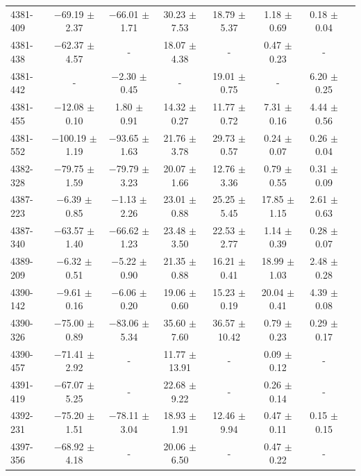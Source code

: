 \documentclass[a4paper,fleqn,usenatbib]{mnras}     %
\begin{document}
\begin{longtable}{l c c c c c c c }
4381-409   &   $-$69.19 $\pm$ 2.37   &   $-$66.01 $\pm$ 1.71   &    30.23 $\pm$ 7.53   &  18.79 $\pm$ 5.37   &   1.18 $\pm$ 0.69   &   0.18 $\pm$ 0.04  \\
4381-438   &   $-$62.37 $\pm$ 4.57   &     -   &    18.07 $\pm$ 4.38   &   -   &   0.47 $\pm$ 0.23   &   -  \\
4381-442   &     -   &    $-$2.30 $\pm$ 0.45   &     -   &  19.01 $\pm$ 0.75   &   -   &   6.20 $\pm$ 0.25  \\
4381-455   &   $-$12.08 $\pm$ 0.10   &     1.80 $\pm$ 0.91   &    14.32 $\pm$ 0.27   &  11.77 $\pm$ 0.72   &   7.31 $\pm$ 0.16   &   4.44 $\pm$ 0.56  \\
4381-552   &  $-$100.19 $\pm$ 1.19   &   $-$93.65 $\pm$ 1.63   &    21.76 $\pm$ 3.78   &  29.73 $\pm$ 0.57   &   0.24 $\pm$ 0.07   &   0.26 $\pm$ 0.04  \\
4382-328   &   $-$79.75 $\pm$ 1.59   &   $-$79.79 $\pm$ 3.23   &    20.07 $\pm$ 1.66   &  12.76 $\pm$ 3.36   &   0.79 $\pm$ 0.55   &   0.31 $\pm$ 0.09  \\
4387-223   &    $-$6.39 $\pm$ 0.85   &    $-$1.13 $\pm$ 2.26   &    23.01 $\pm$ 0.88   &  25.25 $\pm$ 5.45   &  17.85 $\pm$ 1.15   &   2.61 $\pm$ 0.63  \\
4387-340   &   $-$63.57 $\pm$ 1.40   &   $-$66.62 $\pm$ 1.23   &    23.48 $\pm$ 3.50   &  22.53 $\pm$ 2.77   &   1.14 $\pm$ 0.39   &   0.28 $\pm$ 0.07  \\
4389-209   &    $-$6.32 $\pm$ 0.51   &    $-$5.22 $\pm$ 0.90   &    21.35 $\pm$ 0.88   &  16.21 $\pm$ 0.41   &  18.99 $\pm$ 1.03   &   2.48 $\pm$ 0.28  \\
4390-142   &    $-$9.61 $\pm$ 0.16   &    $-$6.06 $\pm$ 0.20   &    19.06 $\pm$ 0.60   &  15.23 $\pm$ 0.19   &  20.04 $\pm$ 0.41   &   4.39 $\pm$ 0.08  \\
4390-326   &   $-$75.00 $\pm$ 0.89   &   $-$83.06 $\pm$ 5.34   &    35.60 $\pm$ 7.60   &  36.57 $\pm$10.42   &   0.79 $\pm$ 0.23   &   0.29 $\pm$ 0.17  \\
4390-457   &   $-$71.41 $\pm$ 2.92   &     -   &    11.77 $\pm$13.91   &   -   &   0.09 $\pm$ 0.12   &   -  \\
4391-419   &   $-$67.07 $\pm$ 5.25   &     -   &    22.68 $\pm$ 9.22   &   -   &   0.26 $\pm$ 0.14   &   -  \\
4392-231   &   $-$75.20 $\pm$ 1.51   &   $-$78.11 $\pm$ 3.04   &    18.93 $\pm$ 1.91   &  12.46 $\pm$ 9.94   &   0.47 $\pm$ 0.11   &   0.15 $\pm$ 0.15  \\
4397-356   &   $-$68.92 $\pm$ 4.18   &     -   &    20.06 $\pm$ 6.50   &   -   &   0.47 $\pm$ 0.22   &   -  \\

\end{longtable}
\end{document}
